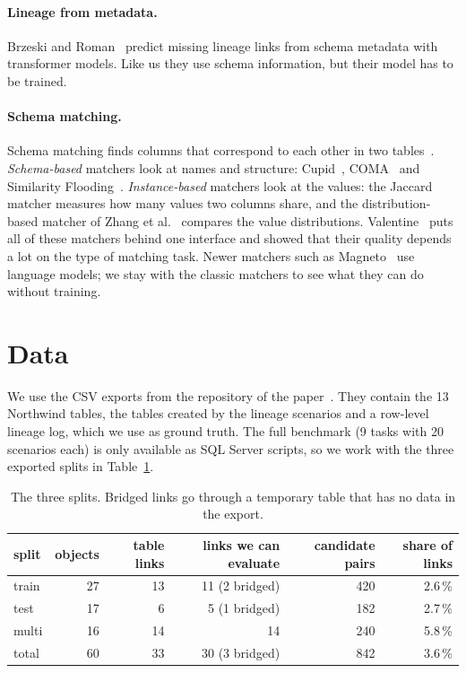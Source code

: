 \documentclass[11pt,a4paper]{article}
\begin{document}
\paragraph{Lineage from metadata.} Brzeski and Roman~\cite{brzeski2025transformer} predict missing lineage links
from schema metadata with transformer models. Like us they use schema information, but their model has to be
trained.

\paragraph{Schema matching.} Schema matching finds columns that correspond to each other in two
tables~\cite{rahm2001survey}. \emph{Schema-based} matchers look at names and structure: Cupid~\cite{madhavan2001cupid},
COMA~\cite{do2002coma} and Similarity Flooding~\cite{melnik2002flooding}. \emph{Instance-based} matchers look at the
values: the Jaccard matcher measures how many values two columns share, and the distribution-based matcher of Zhang
et al.~\cite{zhang2011distribution} compares the value distributions. Valentine~\cite{koutras2021valentine} puts all
of these matchers behind one interface and showed that their quality depends a lot on the type of matching task.
Newer matchers such as Magneto~\cite{liu2025magneto} use language models; we stay with the classic matchers to see
what they can do without training.

\section{Data}\label{sec:data}

We use the CSV exports from the repository of the paper~\cite{dutkiewicz2026rddl}. They contain the 13 Northwind
tables, the tables created by the lineage scenarios and a row-level lineage log, which we use as ground truth. The
full benchmark (9 tasks with 20 scenarios each) is only available as SQL Server scripts, so we work with the three
exported splits in Table~\ref{tab:data}.

\begin{table}[htbp]
\centering\small
\caption{The three splits. Bridged links go through a temporary table that has no data in the export.}
\label{tab:data}
\begin{tabular}{lrrrrr}
\toprule
split & objects & table links & links we can evaluate & candidate pairs & share of links \\
\midrule
train & 27 & 13 & 11 (2 bridged) & 420 & 2.6\,\% \\
test  & 17 & 6  & 5 (1 bridged)  & 182 & 2.7\,\% \\
multi & 16 & 14 & 14             & 240 & 5.8\,\% \\
\midrule
total & 60 & 33 & 30 (3 bridged) & 842 & 3.6\,\% \\
\bottomrule
\end{tabular}
\end{table}
\end{document}

